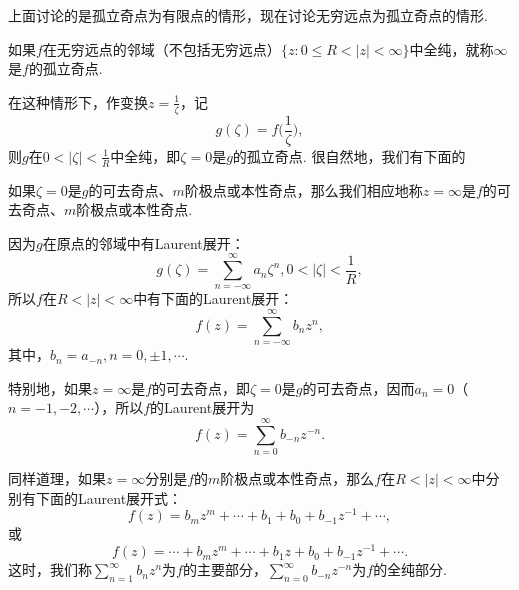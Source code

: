 上面讨论的是孤立奇点为有限点的情形，现在讨论无穷远点为孤立奇点的情形.

如果$f$在无穷远点的邻域（不包括无穷远点）$\{z:0\le R<|z|<\infty\}$中全纯，就称$\infty$是$f$的孤立奇点.

在这种情形下，作变换$z=\frac1\zeta$，记
\[
  g(\zeta) = f\bigg(\frac1\zeta\bigg),
\]
则$g$在$0<|\zeta|<\frac1R$中全纯，即$\zeta=0$是$g$的孤立奇点. 很自然地，我们有下面的
\begin{definition}\label{def5.2.7}
  如果$\zeta=0$是$g$的可去奇点、$m$阶极点或本性奇点，那么我们相应地称$z=\infty$是$f$的可去奇点、$m$阶极点或本性奇点.
\end{definition}

因为$g$在原点的邻域中有Laurent展开：
\[
  g(\zeta) = \sum_{n=-\infty}^\infty a_n\zeta^n ,0 < |\zeta| < \frac1R,
\]
所以$f$在$R<|z|<\infty$中有下面的Laurent展开：
\[
  f(z) = \sum_{n=-\infty}^\infty b_nz^n,
\]
其中，$b_n=a_{-n},n=0,\pm1,\cdots$.

特别地，如果$z=\infty$是$f$的可去奇点，即$\zeta=0$是$g$的可去奇点，因而$a_n=0$（$n=-1,-2,\cdots$），所以$f$的Laurent展开为
\begin{equation}\label{eq5.2.3}
  f(z) = \sum_{n=0}^\infty b_{-n}z^{-n}.
\end{equation}

同样道理，如果$z=\infty$分别是$f$的$m$阶极点或本性奇点，那么$f$在$R<|z|<\infty$中分别有下面的Laurent展开式：
\begin{equation}\label{eq5.2.4}
  f(z) = b_mz^m + \cdots + b_1 + b_0 + b_{-1}z^{-1} + \cdots,
\end{equation}
或
\begin{equation}\label{eq5.2.5}
  f(z) = \cdots + b_mz^m + \cdots + b_1z + b_0 + b_{-1}z^{-1} + \cdots.
\end{equation}
这时，我们称$\sum_{n=1}^\infty b_nz^n$为$f$的主要部分，$\sum_{n=0}^\infty b_{-n}z^{-n}$为$f$的全纯部分.

